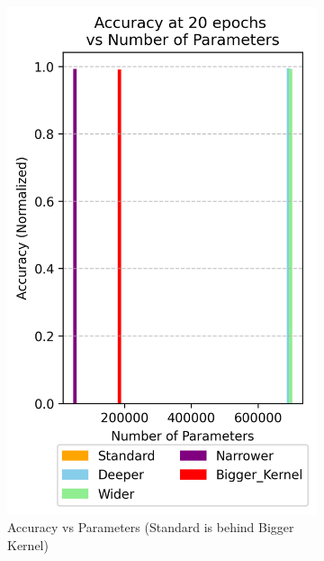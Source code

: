\documentclass{article}
\begin{document}
\begin{figure}[h!]
    \centering
    \begin{subfigure}[t]{0.3\textwidth} %
        \centering
        \includegraphics[width=\textwidth]{./plots/plot13.png} %
        \caption{Accuracy vs Parameters \newline(Standard is behind Bigger Kernel)}
        \label{fig:plot16a}
    \end{subfigure}
    \hspace{0.01\textwidth}
    \begin{subfigure}[t]{0.3\textwidth}
        \centering

\end{subfigure}
\end{figure}
\end{document}
